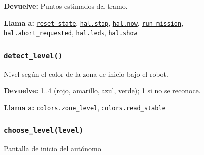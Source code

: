 \par{}\par\smallskip
\noindent\textbf{Devuelve:} Puntos estimados del tramo.\par
\noindent\textbf{Llama a:} \hyperref[fn:autonomous:reset-state]{\texttt{reset\_\allowbreak{}state}}, \hyperref[fn:hal:stop]{\texttt{hal.stop}}, \hyperref[fn:hal:now]{\texttt{hal.now}}, \hyperref[fn:autonomous:run-mission]{\texttt{run\_\allowbreak{}mission}}, \hyperref[fn:hal:abort-requested]{\texttt{hal.abort\_\allowbreak{}requested}}, \hyperref[fn:hal:leds]{\texttt{hal.leds}}, \hyperref[fn:hal:show]{\texttt{hal.show}}\par

\subsubsection{\texttt{detect\_\allowbreak{}level()}}\label{fn:autonomous:detect-level}
\noindent Nivel según el color de la zona de inicio bajo el robot.

\noindent\textbf{Devuelve:} 1..4 (rojo, amarillo, azul, verde); 1 si no se reconoce.\par
\noindent\textbf{Llama a:} \hyperref[fn:colors:zone-level]{\texttt{colors.zone\_\allowbreak{}level}}, \hyperref[fn:colors:read-stable]{\texttt{colors.read\_\allowbreak{}stable}}\par

\subsubsection{\texttt{choose\_\allowbreak{}level(level)}}\label{fn:autonomous:choose-level}
\noindent Pantalla de inicio del autónomo.

